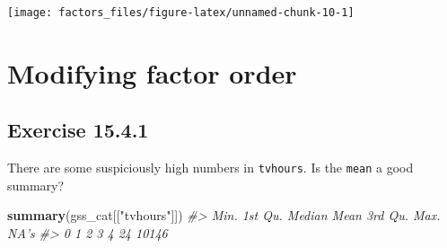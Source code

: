 \documentclass[]{book}
\newenvironment{Shaded}{\begin{snugshade}}{\end{snugshade}}
\newcommand{\CommentTok}[1]{\textcolor[rgb]{0.56,0.35,0.01}{\textit{#1}}}
\newcommand{\DataTypeTok}[1]{\textcolor[rgb]{0.13,0.29,0.53}{#1}}
\newcommand{\DecValTok}[1]{\textcolor[rgb]{0.00,0.00,0.81}{#1}}
\newcommand{\KeywordTok}[1]{\textcolor[rgb]{0.13,0.29,0.53}{\textbf{#1}}}
\newcommand{\NormalTok}[1]{#1}
\newcommand{\OperatorTok}[1]{\textcolor[rgb]{0.81,0.36,0.00}{\textbf{#1}}}
\newcommand{\StringTok}[1]{\textcolor[rgb]{0.31,0.60,0.02}{#1}}
\theoremstyle{plain}
\theoremstyle{remark}
\begin{document}
\begin{Shaded}
\end{Shaded}

\begin{center}\texttt{[image: factors\_files/figure-latex/unnamed-chunk-10-1]} \end{center}

\hypertarget{modifying-factor-order}{%
\section{Modifying factor order}\label{modifying-factor-order}}

\hypertarget{exercise-15.4.1}{%
\subsection*{\texorpdfstring{Exercise
{15.4.1}}{Exercise 15.4.1}}\label{exercise-15.4.1}}

There are some suspiciously high numbers in \texttt{tvhours}. Is the
\texttt{mean} a good summary?

\begin{Shaded}
\begin{Highlighting}[]
\KeywordTok{summary}\NormalTok{(gss_cat[[}\StringTok{"tvhours"}\NormalTok{]])}
\CommentTok{#>    Min. 1st Qu.  Median    Mean 3rd Qu.    Max.    NA's }
\CommentTok{#>       0       1       2       3       4      24   10146}
\end{Highlighting}
\end{Shaded}

\begin{Shaded}
\end{Shaded}
\end{document}
